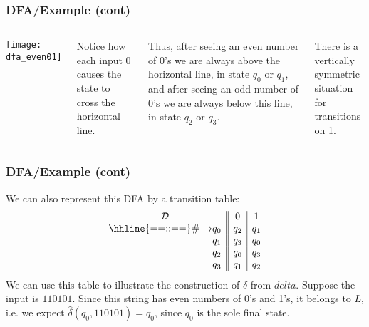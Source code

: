 % 
\begin{frame}
\frametitle{DFA/Example (cont)}

\begin{columns}
  \begin{center}
    \texttt{[image: dfa\_even01]}
  \end{center}

   Notice how each input 0 causes the state to
  cross the horizontal line.

  \bigskip

  Thus, after seeing an even number of 0's we are always above the
  horizontal line, in state \(q_0\) or \(q_1\), and after seeing an
  odd number of 0's we are always below this line, in state \(q_2\) or
  \(q_3\).

  \bigskip

  There is a vertically symmetric situation for transitions on 1.
\end{columns}

\end{frame}

% 
\begin{frame}
\frametitle{DFA/Example (cont)}

We can also represent this DFA by a transition table:
\[
\begin{array}{r@{}l||c|c}
\multicolumn{2}{c||}{\cal D} & 0 & 1\\
\hhline{==::==}
\# \rightarrow & q_0 & q_2 & q_1\\
               & q_1 & q_3 & q_0\\
               & q_2 & q_0 & q_3\\
               & q_3 & q_1 & q_2
\end{array}
\]
We can use this table to illustrate the construction of
\(\hat{\delta}\) from \(delta\). Suppose the input is
\(110101\). Since this string has even numbers of 0's and 1's, it
belongs to \(L\), i.e. we expect \(\hat{\delta}(q_0,110101) = q_0\),
since \(q_0\) is the sole final state.

\end{frame}

